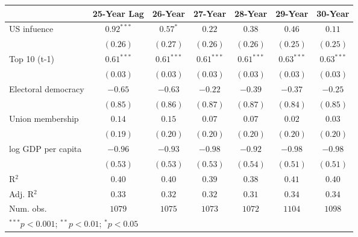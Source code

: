 
\begin{table}
\begin{center}
\begin{tabular}{l c c c c c c}
\toprule
 & 25-Year Lag & 26-Year & 27-Year & 28-Year & 29-Year & 30-Year \\
\midrule
US infuence         & $\mathbf{0.92}^{***}$ & $\mathbf{0.57}^{*}$   & $0.22$                & $0.38$                & $0.46$                & $0.11$                \\
                    & $(0.26)$              & $(0.27)$              & $(0.26)$              & $(0.26)$              & $(0.25)$              & $(0.25)$              \\
Top 10 (t-1)        & $\mathbf{0.61}^{***}$ & $\mathbf{0.61}^{***}$ & $\mathbf{0.61}^{***}$ & $\mathbf{0.61}^{***}$ & $\mathbf{0.63}^{***}$ & $\mathbf{0.63}^{***}$ \\
                    & $(0.03)$              & $(0.03)$              & $(0.03)$              & $(0.03)$              & $(0.03)$              & $(0.03)$              \\
Electoral democracy & $-0.65$               & $-0.63$               & $-0.22$               & $-0.39$               & $-0.37$               & $-0.25$               \\
                    & $(0.85)$              & $(0.86)$              & $(0.87)$              & $(0.87)$              & $(0.84)$              & $(0.85)$              \\
Union membership    & $0.14$                & $0.15$                & $0.07$                & $0.07$                & $0.02$                & $0.03$                \\
                    & $(0.19)$              & $(0.20)$              & $(0.20)$              & $(0.20)$              & $(0.20)$              & $(0.20)$              \\
log GDP per capita  & $-0.96$               & $-0.93$               & $-0.98$               & $-0.92$               & $-0.98$               & $-0.98$               \\
                    & $(0.53)$              & $(0.53)$              & $(0.53)$              & $(0.54)$              & $(0.51)$              & $(0.51)$              \\
\midrule
R$^2$               & $0.40$                & $0.40$                & $0.39$                & $0.38$                & $0.41$                & $0.40$                \\
Adj. R$^2$          & $0.33$                & $0.32$                & $0.32$                & $0.31$                & $0.34$                & $0.34$                \\
Num. obs.           & $1079$                & $1075$                & $1073$                & $1072$                & $1104$                & $1098$                \\
\bottomrule
\multicolumn{7}{l}{\scriptsize{$^{***}p<0.001$; $^{**}p<0.01$; $^{*}p<0.05$}}
\end{tabular}
\label{table:coefficients}
\end{center}
\end{table}
